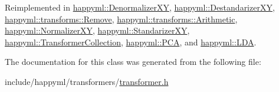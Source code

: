 Reimplemented in \hyperlink{classhappyml_1_1DenormalizerXY_a22e45e0e3595ede802dca4c4cf772a73}{happyml\+::\+Denormalizer\+XY}, \hyperlink{classhappyml_1_1DestandarizerXY_a21481d414441642b50b04d43f6c55ac0}{happyml\+::\+Destandarizer\+XY}, \hyperlink{classhappyml_1_1transforms_1_1Remove_a249eec291d4c15b4e8e044c38a994770}{happyml\+::transforms\+::\+Remove}, \hyperlink{classhappyml_1_1transforms_1_1Arithmetic_ac32e38e089435dc407bc9b7a338bc845}{happyml\+::transforms\+::\+Arithmetic}, \hyperlink{classhappyml_1_1NormalizerXY_a0f10be1b98dfc3125990310ee649ee8e}{happyml\+::\+Normalizer\+XY}, \hyperlink{classhappyml_1_1StandarizerXY_a800a8953dbf96c26edca660680ce791f}{happyml\+::\+Standarizer\+XY}, \hyperlink{classhappyml_1_1TransformerCollection_a36511b731522cda1cadbe3fa4299f6bf}{happyml\+::\+Transformer\+Collection}, \hyperlink{classhappyml_1_1PCA_a2a630892c653832287bb3df4ab002d51}{happyml\+::\+P\+CA}, and \hyperlink{classhappyml_1_1LDA_a2b98a4675abdb0985347491224136b5c}{happyml\+::\+L\+DA}.



The documentation for this class was generated from the following file\+:\begin{DoxyCompactItemize}
\item 
include/happyml/transformers/\hyperlink{transformer_8h}{transformer.\+h}\end{DoxyCompactItemize}
